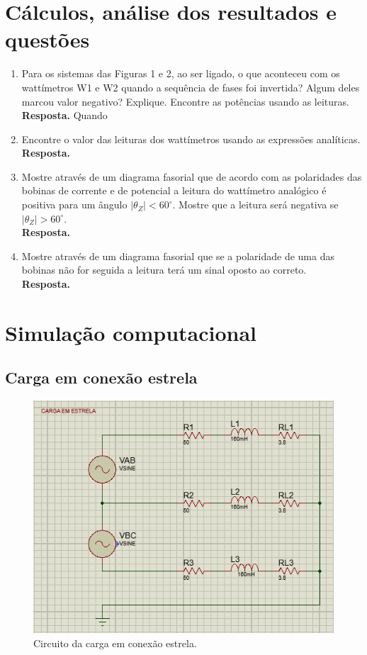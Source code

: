 \documentclass[a4paper,12pt,oneside,openany,table,xcdraw]{article}
\begin{document}
\section{Cálculos, análise dos resultados e questões} %
\begin{enumerate}[1)]
\item Para os sistemas das Figuras 1 e 2, ao ser ligado, o que aconteceu com os wattímetros W1 e W2 quando a sequência de fases foi invertida? Algum deles marcou valor negativo? Explique. Encontre as potências usando as leituras. \\
\textbf{Resposta.} Quando 

\item  Encontre o valor das leituras dos wattímetros usando as expressões analíticas. \\
\textbf{Resposta.} 

\item  Mostre através de um diagrama fasorial que de acordo com as polaridades das bobinas de corrente e de potencial a leitura do wattímetro analógico é positiva para um ângulo $| \theta_Z| < 60^\circ$. Mostre que a leitura será negativa se $| \theta_Z| > 60^\circ$. \\
\textbf{Resposta.} 

\item  Mostre através de um diagrama fasorial que se a polaridade de uma das bobinas não for seguida a leitura terá um sinal oposto ao correto.  \\
\textbf{Resposta.} 

\end{enumerate}

\newpage
\section{Simulação computacional} %
\subsection{Carga em conexão estrela}
\begin{figure}[H]
\centering
\captionsetup{font=scriptsize}
\includegraphics[width=14cm]{sim1}
\caption{Circuito da carga em conexão estrela.}
\label{sim1}
\end{figure}
\end{document}
